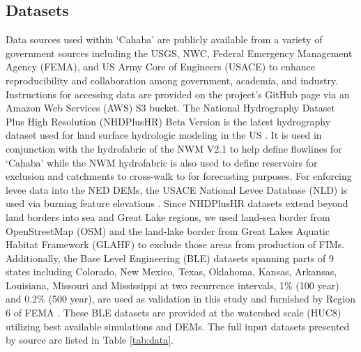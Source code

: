 \subsection{Datasets}
\label{ssec:datasets}
%
Data sources used within `Cahaba' are publicly available from a variety of government sources including the USGS, NWC, Federal Emergency Management Agency (FEMA), and US Army Core of Engineers (USACE) to enhance reproducibility and collaboration among government, academia, and industry.
Instructions for accessing data are provided on the project's GitHub page via an Amazon Web Services (AWS) S3 bucket.
The National Hydrography Dataset Plus High Resolution (NHDPlusHR) Beta Version is the latest hydrography dataset used for land surface hydrologic modeling in the US \cite{moore2019user}. 
It is used in conjunction with the hydrofabric of the NWM V2.1 to help define flowlines for `Cahaba' while the NWM hydrofabric is also used to define reservoirs for exclusion and catchments to cross-walk to for forecasting purposes.
For enforcing levee data into the NED DEMs, the USACE National Levee Database (NLD) is used via burning feature elevations \cite{engineers2016national}.
Since NHDPlusHR datasets extend beyond land borders into sea and Great Lake regions, we used land-sea border from OpenStreetMap (OSM) and the land-lake border from Great Lakes Aquatic Habitat Framework (GLAHF) to exclude those areas from production of FIMs.
Additionally, the Base Level Engineering (BLE) datasets spanning parts of 9 states including Colorado, New Mexico, Texas, Oklahoma, Kansas, Arkansas, Louisiana, Missouri and Mississippi at two recurrence intervals, 1\% (100 year) and 0.2\% (500 year), are used as validation in this study and furnished by Region 6 of FEMA \cite{fema2021base,fema2021estimated}. 
These BLE datasets are provided at the watershed scale (HUC8) utilizing best available simulations and DEMs.
The full input datasets presented by source are listed in Table \ref{tab:data}.
%
